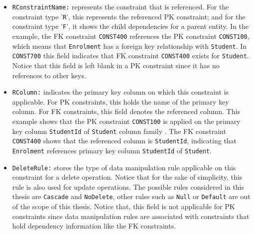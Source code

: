 \begin{itemize}
  \item \texttt{RConstraintName:} represents the constraint that is referenced.
  For the constraint type '\texttt{R}', this represents the referenced \ac{PK}
  constraint; and for the constraint type '\texttt{F}', it shows the child
  dependencies for a parent entity. In the example, the \ac{FK} constraint
  \texttt{CONST400} references the \ac{PK} constraint \texttt{CONST100},  which
  means that \texttt{Enrolment} has a foreign key relationship with
  \texttt{Student}. In \texttt{CONST700} this field indicates that \ac{FK}
  constraint \texttt{CONST400} exists for \texttt{Student}. Notice that this
  field is left blank in a \ac{PK} constraint since it has no references to
  other keys.
  
  \item \texttt{RColumn:}  indicates the primary key column on which this
  constraint is applicable.  For \ac{PK} constraints,  this holds the name of
  the primary key column. For \ac{FK} constraints, this field denotes
  the referenced column.  This example shows that the \ac{PK} constraint
  \texttt{CONST100} is applied on the primary key column \texttt{StudentId} of
  \texttt{Student} column family . The \ac{FK} constraint \texttt{CONST400}
  shows that the referenced column is \texttt{StudentId},  indicating that
  \texttt{Enrolment} references  primary key column \texttt{StudentId} of
  \texttt{Student}.
  
  \item \texttt{DeleteRule:} stores the type of data manipulation rule
  applicable on this constraint for a delete operation. Notice that for the
  sake of simplicity, this rule is also used for update operations. The possible
  rules considered in this thesis are \texttt{Cascade} and \texttt{NoDelete},
  other rules such as \texttt{Null} or \texttt{Default} are out of the scope of
  this thesis.  
  Notice that, this field is not applicable for
  \ac{PK} constraints since data manipulation rules are associated with
  constraints that hold dependency information like the \ac{FK} constraints.
  

  
\end{itemize} 

